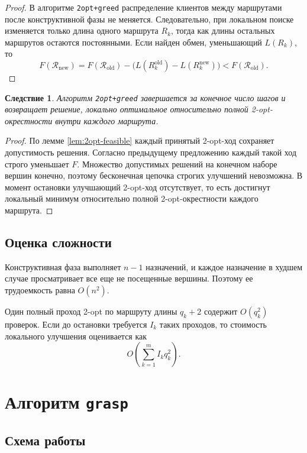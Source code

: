 \documentclass[a4paper,12pt]{article}
\newtheorem{corollary}{Следствие}[section]
\newcommand{\obj}{F}
\begin{document}
\begin{proof}
В алгоритме \texttt{2opt+greed} распределение клиентов между маршрутами после конструктивной
фазы не меняется. Следовательно, при локальном поиске изменяется только длина одного
маршрута \(R_k\), тогда как длины остальных маршрутов остаются постоянными. Если найден
обмен, уменьшающий \(L(R_k)\), то
\[
\obj(\mathcal{R}_{\mathrm{new}})
= \obj(\mathcal{R}_{\mathrm{old}})
  - \bigl(L(R_k^{\mathrm{old}}) - L(R_k^{\mathrm{new}})\bigr)
< \obj(\mathcal{R}_{\mathrm{old}}).
\]
\end{proof}

\begin{corollary}
Алгоритм \texttt{2opt+greed} завершается за конечное число шагов и возвращает решение,
локально оптимальное относительно полной 2-opt-окрестности внутри каждого маршрута.
\end{corollary}

\begin{proof}
По лемме \ref{lem:2opt-feasible} каждый принятый 2-opt-ход сохраняет допустимость решения.
Согласно предыдущему предложению каждый такой ход строго уменьшает \(\obj\). Множество
допустимых решений на конечном наборе вершин конечно, поэтому бесконечная цепочка строгих
улучшений невозможна. В момент остановки улучшающий 2-opt-ход отсутствует, то есть достигнут
локальный минимум относительно полной 2-opt-окрестности каждого маршрута.
\end{proof}

\subsection{Оценка сложности}

Конструктивная фаза выполняет \(n-1\) назначений, и каждое назначение в худшем случае
просматривает все еще не посещенные вершины. Поэтому ее трудоемкость равна \(O(n^2)\).

Один полный проход 2-opt по маршруту длины \(q_k+2\) содержит \(O(q_k^2)\) проверок.
Если до остановки требуется \(I_k\) таких проходов, то стоимость локального улучшения
оценивается как
\[
O\!\left(\sum_{k=1}^{m} I_k q_k^2\right).
\]

\section{Алгоритм \texttt{grasp}}

\subsection{Схема работы}
\end{document}

